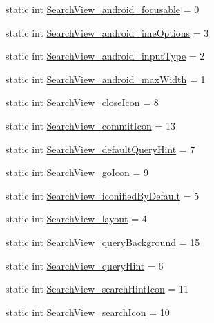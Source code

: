 \begin{DoxyCompactItemize}
\item 
static int \hyperlink{classandroid_1_1support_1_1v4_1_1R_1_1styleable_a15b3e3cff98da6d5a2c8593d91db27c0}{Search\+View\+\_\+android\+\_\+focusable} = 0
\item 
static int \hyperlink{classandroid_1_1support_1_1v4_1_1R_1_1styleable_aa47416f4b0bf94243cc7bc1d3714bb22}{Search\+View\+\_\+android\+\_\+ime\+Options} = 3
\item 
static int \hyperlink{classandroid_1_1support_1_1v4_1_1R_1_1styleable_afedfd4965c66397606be2ed3d76fe9c0}{Search\+View\+\_\+android\+\_\+input\+Type} = 2
\item 
static int \hyperlink{classandroid_1_1support_1_1v4_1_1R_1_1styleable_aa1fcd209f07b6bb82802f5b87852f157}{Search\+View\+\_\+android\+\_\+max\+Width} = 1
\item 
static int \hyperlink{classandroid_1_1support_1_1v4_1_1R_1_1styleable_af517a70a4f7a1112d44a394839d8ffaf}{Search\+View\+\_\+close\+Icon} = 8
\item 
static int \hyperlink{classandroid_1_1support_1_1v4_1_1R_1_1styleable_a249a336fa30e7f77fa15e369b5db4e59}{Search\+View\+\_\+commit\+Icon} = 13
\item 
static int \hyperlink{classandroid_1_1support_1_1v4_1_1R_1_1styleable_a0dba0574ce30d30bc8ac0941fe674251}{Search\+View\+\_\+default\+Query\+Hint} = 7
\item 
static int \hyperlink{classandroid_1_1support_1_1v4_1_1R_1_1styleable_a4650e52ef5aadf8f43fe5a614b055cc4}{Search\+View\+\_\+go\+Icon} = 9
\item 
static int \hyperlink{classandroid_1_1support_1_1v4_1_1R_1_1styleable_a417d0b0a020ec93e98525e018b21b07a}{Search\+View\+\_\+iconified\+By\+Default} = 5
\item 
static int \hyperlink{classandroid_1_1support_1_1v4_1_1R_1_1styleable_a2df4c8970df3d39b8fca7d3605a3ac4d}{Search\+View\+\_\+layout} = 4
\item 
static int \hyperlink{classandroid_1_1support_1_1v4_1_1R_1_1styleable_ac2a79ceebc50d310a3dbad7676afab25}{Search\+View\+\_\+query\+Background} = 15
\item 
static int \hyperlink{classandroid_1_1support_1_1v4_1_1R_1_1styleable_a2094501d783cc294675c58b0b5ef484a}{Search\+View\+\_\+query\+Hint} = 6
\item 
static int \hyperlink{classandroid_1_1support_1_1v4_1_1R_1_1styleable_a061d67b6fc4b4b493ef5993fa1bcf0ce}{Search\+View\+\_\+search\+Hint\+Icon} = 11
\item 
static int \hyperlink{classandroid_1_1support_1_1v4_1_1R_1_1styleable_ab225bc2b5b5cdc07178516697d75824e}{Search\+View\+\_\+search\+Icon} = 10

\end{DoxyCompactItemize}
